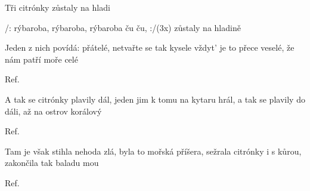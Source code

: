 \begin{TEXT}{Tři citrónky}
\SLOKA {}   
  
   
zůstaly na hladi

\REFREN /: rýbaroba, rýbaroba, rýbaroba ču ču, :/(3x)
zůstaly na hladině

\SLOKA Jeden z nich povídá: přátelé,
netvařte se tak kysele
vždyt' je to přece veselé, 
že nám patří moře celé

\REFREN Ref.

\SLOKA A tak se citrónky plavily dál,
jeden jim k tomu na kytaru hrál,
a tak se plavily do dáli,
až na ostrov korálový

\REFREN Ref.

\SLOKA Tam je však stihla nehoda zlá,
byla to mořská příšera,
sežrala citrónky i s kůrou,
zakončila tak baladu mou

\REFREN Ref.

\end{TEXT}